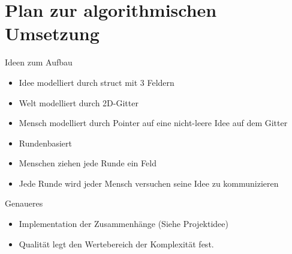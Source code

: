 \section{Plan zur algorithmischen Umsetzung}
\begin{frame}{Ideen zum Aufbau}
	\begin{itemize}[<+->]
		\item Idee modelliert durch struct mit 3 Feldern
		\item Welt modelliert durch 2D-Gitter
		\item Mensch modelliert durch Pointer auf eine nicht-leere Idee auf dem Gitter
		\item Rundenbasiert
		\item Menschen ziehen jede Runde ein Feld
		\item Jede Runde wird jeder Mensch versuchen seine Idee zu kommunizieren
	\end{itemize}		
\end{frame}

\begin{frame}{Genaueres}
	\begin{itemize}[<+->]
		\item Implementation der Zusammenhänge (Siehe Projektidee)
		\item Qualität legt den Wertebereich der Komplexität fest.
	\end{itemize}
\end{frame}